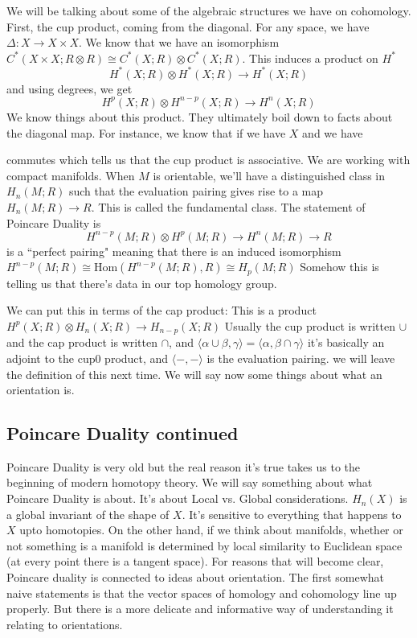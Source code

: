 \documentclass[10pt]{article}
\theoremstyle{definition}
\begin{document}
	We will be talking about some of the algebraic structures we have on cohomology. First, the cup product, coming from the diagonal. For any space, we have $\Delta:X\to X\times X$. We know that we have an isomorphism $C^\ast(X\times X;R\otimes R)\cong C^\ast(X;R)\otimes C^\ast(X;R)$. This induces a product on $H^*$ 
	\[
	H^*(X;R)\otimes H^*(X;R)\to H^*(X;R)
	\]
	and using degrees, we get
	\[
	H^p(X;R)\otimes H^{n-p}(X;R)\to H^n(X;R)
	\]
	We know things about this product. They ultimately boil down to facts about the diagonal map. For instance, we know that if we have $X$ and we have \begin{center}
		\end{center}
		commutes which tells us that the cup product is associative. We are working with compact manifolds. When $M$ is orientable, we'll have a distinguished class in $H_n(M;R)$ such that the evaluation pairing gives rise to a map $H_n(M;R)\to R$. This is called the fundamental class. The statement of Poincare Duality is 
		\[
		H^{n-p}(M;R)\otimes H^{p}(M;R)\to H^n(M;R)\to R
		\]
		is a ``perfect pairing" meaning that there is an induced isomorphism $H^{n-p}(M;R)\cong \text{Hom}(H^{n-p}(M;R),R)\cong H_p(M;R)$ Somehow this is telling us that there's data in our top homology group. 
		
		We can put this in terms of the cap product: This is a product 
		$H^p(X;R)\otimes H_n(X;R)\to H_{n-p}(X;R)$ Usually the cup product is written $\cup$ and the cap product is written $\cap$, and $\langle\alpha\cup \beta, \gamma\rangle=\langle\alpha,  \beta\cap\gamma\rangle$ it's basically an adjoint to the cup0 product, and $\langle-,-\rangle$ is the evaluation pairing. we will leave the definition of this next time. We will say now some things about what an orientation is. 

\subsection{Poincare Duality continued}
Poincare Duality is very old but the real reason it's true takes us to the beginning of modern homotopy theory. We will say something about what Poincare Duality is about. It's about Local vs. Global considerations. $H_n(X)$ is a global invariant of the shape of $X$. It's sensitive to everything that happens to $X$ upto homotopies. On the other hand, if we think about manifolds, whether or not something is a manifold is determined by local similarity to Euclidean space (at every point there is a tangent space). For reasons that will become clear, Poincare duality is connected to ideas about orientation. The first somewhat naive statements is that the vector spaces of homology and cohomology line up properly. But there is a more delicate and informative way of understanding it relating to orientations. 
\end{document}

